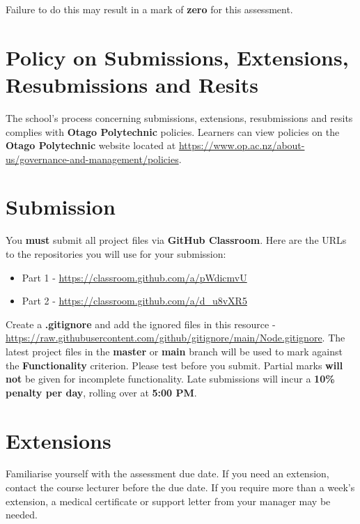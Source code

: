 \documentclass{article}
\begin{document}
 Failure to do this may result in a mark of \textbf{zero} for this assessment. 

\section*{Policy on Submissions, Extensions, Resubmissions and Resits}
The school's process concerning submissions, extensions, resubmissions and resits complies with \textbf{Otago Polytechnic} policies. Learners can view policies on the \textbf{Otago Polytechnic} website located at \href{https://www.op.ac.nz/about-us/governance-and-management/policies}{https://www.op.ac.nz/about-us/governance-and-management/policies}.

\section*{Submission}
You \textbf{must} submit all project files via \textbf{GitHub Classroom}. Here are the URLs to the repositories you will use for your submission:

\begin{itemize}
	\item Part 1 - \href{https://classroom.github.com/a/pWdicmvU}{https://classroom.github.com/a/pWdicmvU}
	\item Part 2 - \href{https://classroom.github.com/a/d\_u8vXR5}{https://classroom.github.com/a/d\_u8vXR5}
\end{itemize}

Create a \textbf{.gitignore} and add the ignored files in this resource - \href{https://raw.githubusercontent.com/github/gitignore/main/Node.gitignore}{https://raw.githubusercontent.com/github/gitignore/main/Node.gitignore}. The latest project files in the \textbf{master} or \textbf{main} branch will be used to mark against the \textbf{Functionality} criterion. Please test before you submit. Partial marks \textbf{will not} be given for incomplete functionality. Late submissions will incur a \textbf{10\% penalty per day}, rolling over at \textbf{5:00 PM}.

\section*{Extensions}
Familiarise yourself with the assessment due date. If you need an extension, contact the course lecturer before the due date. If you require more than a week's extension, a medical certificate or support letter from your manager may be needed.
\end{document}
